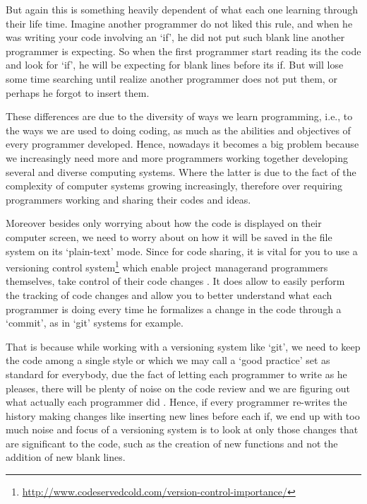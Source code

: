     But again this is something heavily dependent of what each one learning
    through their life time. Imagine another programmer do not liked this rule,
    and when he was writing your code involving an `if', he did not put such
    blank line another programmer is expecting. So when the first programmer
    start reading its the code and look for `if', he will be expecting for blank
    lines before its if\s. But will lose some time searching until realize
    another programmer does not put them, or perhaps he forgot to insert them.
    \cite{quantifyingProgramComprehension}

    These differences are due to the diversity of ways we learn programming,
    i.e., to the ways we are used to doing coding, as much as the abilities and
    objectives of every programmer developed. Hence, nowadays it becomes a big
    problem because we increasingly need more and more programmers working
    together developing several and diverse computing systems. Where the latter
    is due to the fact of the complexity of computer systems growing
    increasingly, therefore over requiring programmers working and sharing their
    codes and ideas. \cite{howProgrammersRead}

    Moreover besides only worrying about how the code is displayed on their
    computer screen, we need to worry about on how it will be saved in the file
    system on its `plain-text' mode. Since for code sharing, it is vital for you
    to use a versioning control system\footnote{\url{http://www.codeservedcold.com/version-control-importance/}}
    which enable project manager\s and
    programmers themselves, take control of their code changes
    \cite{redesignOfGit}. It does allow to easily perform the tracking of code
    changes \cite{gettingProductive} and
    allow you to better understand what each programmer is doing
    every time he formalizes a change in the code through a `commit', as in
    `git' systems for example. \cite{usingSourceControl}

    That is because while working with a versioning system like `git', we need
    to keep the code among a single style or which we may call a `good practice'
    set as standard for everybody, due the fact of letting each programmer to
    write as he pleases, there will be plenty of noise on the code review and we
    are figuring out what actually each programmer did \cite{quitDiffCalculating}.
    Hence, if every programmer re-writes the history making changes
    like inserting new lines
    before each if, we end up with too much noise and focus of a versioning
    system is to look at only those changes that are significant to the code,
    such as the creation of new functions and not the addition of new blank
    lines. \cite{findingRegressionsInProjects}


